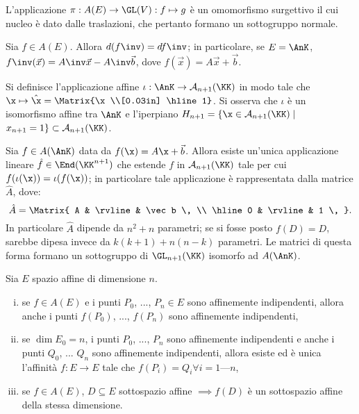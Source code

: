 \documentclass[10pt,landscape]{article}
\begin{document}
\begin{multicols}{3}
        L'applicazione $\pi : A(E)\rightarrow \GL(V) : f  \mapsto g$ è un omomorfismo surgettivo il cui nucleo è dato dalle traslazioni, che pertanto formano un sottogruppo normale.

        Sia $f \in A(E)$. Allora $d(f\inv) = df\inv$; in particolare, se $E = \AnK$, $f\inv(\vec x) = A\inv \vec x - A\inv \vec b$, dove $f(\vec x) = A \vec x + \vec b$.

        Si definisce l'applicazione affine $\iota : \AnK \to 
        \mathcal{A}_{n+1}(\KK)$ in modo tale che $\x \mapsto \hat{\x}=\Matrix{\x \\[0.03in] \hline 1}$. Si osserva che $\iota$
        è un isomorfismo affine tra $\AnK$ e l'iperpiano $H_{n+1}=\{\x\in \mathcal{A}_{n+1}(\KK)\mid$ $ x_{n+1}=1\}\subset \mathcal{A}_{n+1}(\KK)$.

        Sia $f \in A(\AnK)$ data da $f(\x)=A\x+\Vec{b}$.
        Allora esiste un'unica applicazione lineare $\hat f \in \End(\KK^{n+1})$ che estende $f$ in $\mathcal{A}_{n+1}(\KK)$ tale per cui
        $f(\iota(\x)) = \iota(f(\x))$; in particolare tale
        applicazione è rappresentata dalla matrice $\hat A$, dove:
        \[ \hat{A}=\Matrix{ A & \rvline & \vec b \, \\ \hline 0 & \rvline & 1 \, }. \]
        In particolare $\hat A$ dipende da $n^2 + n$ parametri; se si fosse posto $f(D) = D$, sarebbe dipesa invece da $k(k+1) + n(n-k)$ parametri. Le matrici di questa forma formano un sottogruppo di $\GL_{n+1}(\KK)$ isomorfo ad $A(\AnK)$.

        Sia $E$ spazio affine di dimensione $n$.
        
        \begin{enumerate}[(i)]
            \item se $f\in A(E)$ e i punti $P_0$, ..., $P_n \in E$ sono affinemente indipendenti, allora anche i punti $f(P_0)$, ..., $f(P_n)$ sono affinemente indipendenti,
            \item se $\dim E_0 = n$, i punti $P_0$, ..., $P_n$ sono affinemente indipendenti e anche i punti $Q_0$, ... $Q_n$ sono affinemente indipendenti, allora esiste ed è unica l'affinità $f : E \rightarrow E$ tale che $f(P_i)=Q_i \forall i=1\text{---}n$,
            \item se $f\in A(E)$, $D \subseteq E$ sottospazio affine $\implies f(D)$ è un sottospazio affine della stessa dimensione.
        \end{enumerate}
        

\end{multicols}
\end{document}
